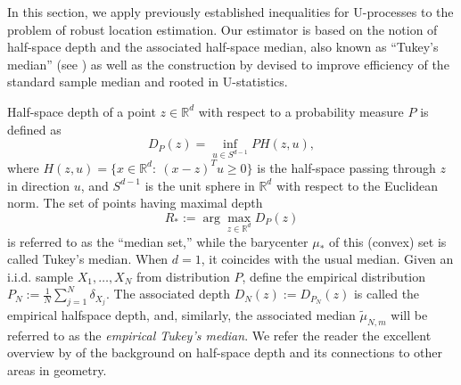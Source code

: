 \documentclass[12pt]{article}
\newcommand{\wt}{\widetilde}
\newcommand{\mb}{\mathbb}
\theoremstyle{thmstyletwo}%
\theoremstyle{thmstylethree}%
\begin{document}
In this section, we apply previously established inequalities for U-processes to the problem of robust location estimation. Our estimator is based on the notion of half-space depth and the associated half-space median, also known as ``Tukey's median'' (see \citep{hodges1955bivariate,tukey1975mathematics,donoho1992breakdown}) as well as the construction by \cite{hodges1963estimates} devised to improve efficiency of the standard sample median and rooted in U-statistics. 

Half-space depth of a point $z\in \mb R^d$ with respect to a probability measure $P$ is defined as  
\begin{equation*}
D_P(z)=\inf_{u\in S^{d-1}} P H(z,u),
\end{equation*}
where $H(z,u)=\{x\in \mathbb{R}^d:\ (x-z)^T u \geq 0\}$  is the half-space passing through $z$ in direction $u$, and $S^{d-1}$ is the unit sphere in $\mb R^d$ with respect to the Euclidean norm. 
The set of points having maximal depth 
\[
R_\ast:=\arg\max_{z\in \mb R^d} D_P(z)
\]
is referred to as the ``median set,'' while the barycenter $\mu_\ast$ of this (convex) set is called Tukey's median. When $d=1$, it coincides with the usual median.  Given an i.i.d. sample $X_1,\ldots,X_N$ from distribution $P$, define the empirical distribution $P_N:=\frac{1}{N}\sum_{j=1}^N \delta_{X_j}$. The associated depth $D_N(z):=D_{P_N}(z)$ is called the empirical halfspace depth, and, similarly, the associated median $\wt\mu_{N,m}$ will be referred to as the \emph{empirical Tukey's median}. 
We refer the reader the excellent overview by \cite{nagy2022halfspace} of the background on half-space depth and its connections to other areas in geometry. 
\end{document}
